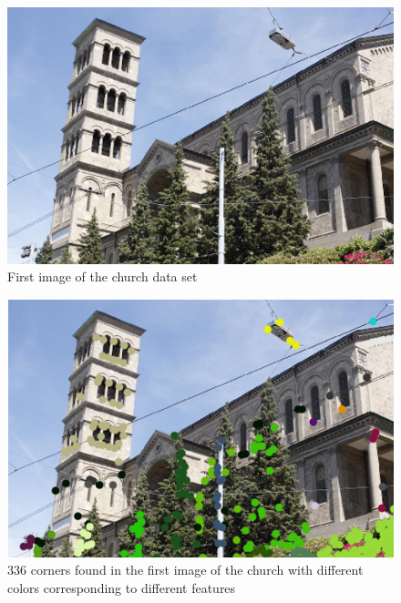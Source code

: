 \begin{figure}[h!]
\centering
\includegraphics[width=1 \textwidth]{./Diagrams/first_frame_church.png}
\caption{First image of the church data set}
\label{fig:first_frame_church}
\end{figure}

\begin{figure}[h!]
\centering
\includegraphics[width=1\textwidth]{./Diagrams/first_frame_church_points.png}
\caption{336 corners found in the first image of the church with different colors corresponding to different features}
\label{fig:first_frame_church_points}
\end{figure}

